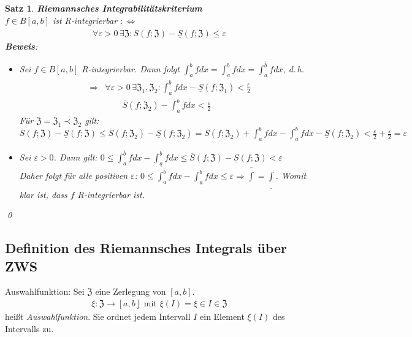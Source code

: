 \documentclass[ngerman,titlepage,twoside, parskip=half*]{scrreprt}
\newcommand*{\ZZ}{\mathfrak{Z}}
\newcommand*{\perdef}{:\Leftrightarrow}
\theoremstyle{plain}
\newtheorem{theorem}{Satz}[section]
\theoremstyle{definition}
\theoremstyle{remark}
\begin{document}
\begin{theorem}
  \textbf{Riemannsches Integrabilitätskriterium}\\
  $f\in B[a,b]$ ist R-integrierbar $\perdef$
  \begin{gather*}\forall \varepsilon>0\,\exists \ZZ \colon \overline{S}(f;\ZZ)-
  \underline{S}(f;\ZZ)\leq \varepsilon\end{gather*}
  \textbf{Beweis}:
  \begin{itemize}
    \item["`$\Rightarrow$"'] Sei $f\in B[a,b]$ R-integrierbar. Dann folgt
      $\int_a^b fdx=\int_{\underline{a}}^b fdx = \int_a^{\overline{b}} fdx$,
      d.\,h.
      \begin{align}
        &\Rightarrow& \forall\varepsilon>0\,\exists\ZZ_1,\ZZ_2\colon\int_a^b fdx
        -\underline{S}(f;\ZZ_1)<\frac{\varepsilon}{2}\\
        & & \qquad \overline{S}(f;\ZZ_2)-\int_a^b fdx < \frac{\varepsilon}{2}
      \end{align}
      Für $\ZZ=\ZZ_1\prec\ZZ_2$ gilt: $\overline{S}(f;\ZZ)-\underline{S}(f;\ZZ)
      \leq \overline{S}(f;\ZZ_2)-\underline{S}(f;\ZZ_2) = 
      \overline{S}(f;\ZZ_2)+\int_a^b fdx-\int_a^b fdx-\underline{S}(f;\ZZ_2)
      <\frac{\varepsilon}{2}+\frac{\varepsilon}{2}=\varepsilon$
    \item["`$\Leftrightarrow$"'] Sei $\varepsilon>0$. Dann gilt: $0\leq
      \int_a^{\overline{b}} fdx - \int_{\underline{a}}^b fdx\leq
      \overline{S}(f;\ZZ)-\underline{S}(f;\ZZ)<\varepsilon$\\
      Daher folgt für alle positiven $\varepsilon$: $0\leq
      \int_a^{\overline{b}} fdx - \int_{\underline{a}}^b fdx\leq \varepsilon
      \Rightarrow \overline{\int}=\underline{\int}$. Womit klar ist, dass $f$ 
      R-integrierbar ist.
  \end{itemize}
  \qed
\end{theorem}

\subsection{Definition des Riemannsches Integrals über ZWS}

Auswahlfunktion: Sei $\ZZ$ eine Zerlegung von $[a,b]$.
\begin{gather*}\xi\colon\ZZ\rightarrow[a,b] \text{ mit } \xi(I)=\xi\in I\in\ZZ\end{gather*}
heißt \emph{Auswahlfunktion}. Sie ordnet jedem
Intervall $I$ ein Element $\xi(I)$ des Intervalls zu.
\end{document}
